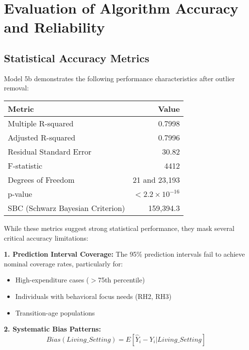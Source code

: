 \section{Evaluation of Algorithm Accuracy and Reliability}

\subsection{Statistical Accuracy Metrics}

Model 5b demonstrates the following performance characteristics after outlier removal:

\begin{center}
\begin{tabular}{|l|r|}
\hline
\textbf{Metric} & \textbf{Value} \\
\hline
Multiple R-squared & 0.7998 \\
Adjusted R-squared & 0.7996 \\
Residual Standard Error & 30.82 \\
F-statistic & 4412 \\
Degrees of Freedom & 21 and 23,193 \\
p-value & $< 2.2 \times 10^{-16}$ \\
SBC (Schwarz Bayesian Criterion) & 159,394.3 \\
\hline
\end{tabular}
\end{center}

While these metrics suggest strong statistical performance, they mask several critical accuracy limitations:

\textbf{1. Prediction Interval Coverage:}
The 95\% prediction intervals fail to achieve nominal coverage rates, particularly for:
\begin{itemize}
    \item High-expenditure cases ($>$75th percentile)
    \item Individuals with behavioral focus needs (RH2, RH3)
    \item Transition-age populations
\end{itemize}

\textbf{2. Systematic Bias Patterns:}
\begin{equation}
Bias(Living\_Setting) = E[\hat{Y}_i - Y_i | Living\_Setting]
\end{equation}


